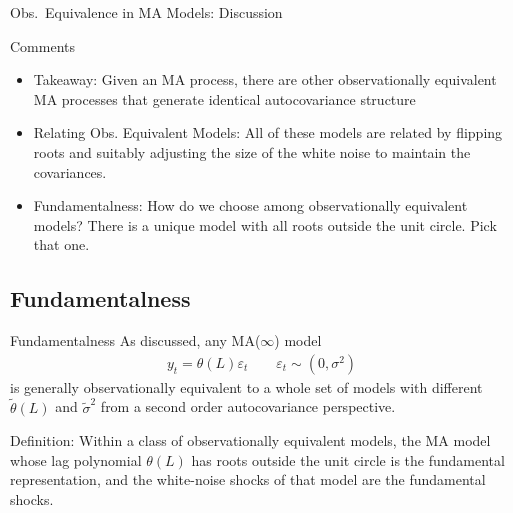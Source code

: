 \documentclass[aspectratio=169, handout]{beamer}
\begin{document}
{\footnotesize
\begin{frame}{Obs.\ Equivalence in MA Models: Discussion}

Comments
\begin{itemize}
  \item \alert{Takeaway}: Given an MA process, there are other
    observationally equivalent MA processes that generate
    \alert{identical} autocovariance structure


  \item \alert{Relating Obs. Equivalent Models}:
    All of these models are related by \alert{flipping roots} and
    suitably adjusting the size of the white noise to maintain the
    covariances.

  \pause
  \item
    \alert{Fundamentalness}:
    How do we choose among observationally equivalent models?
    There is a \alert{unique} model with all roots outside the unit
    circle.
    Pick that one.
\end{itemize}
\end{frame}
}


\subsection{Fundamentalness}

{\footnotesize
\begin{frame}{Fundamentalness}
As discussed, any MA($\infty$) model
\begin{align*}
  y_t = \theta(L)\varepsilon_t
  \qquad
  \varepsilon_t\sim(0,\sigma^2)
\end{align*}
is generally \alert{observationally equivalent} to a whole set of models
with different $\tilde{\theta}(L)$ and $\tilde{\sigma}^2$ from a second
order autocovariance perspective.

\pause
Definition:
Within a class of observationally equivalent models,
the MA model whose lag polynomial $\theta(L)$ has
\alert{roots outside the unit circle} is the \alert{fundamental}
representation, and the white-noise shocks of that model are the
\alert{fundamental shocks}.
\end{frame}
}
\end{document}

